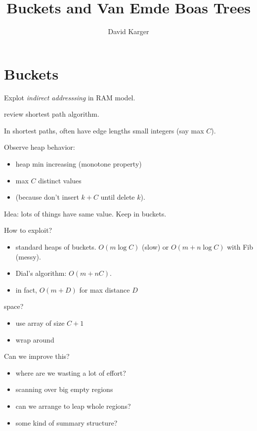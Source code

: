 \documentclass{article}
\title{Buckets and Van Emde Boas Trees}
\author{David Karger}
\begin{document}
\section{Buckets}

Explot \emph{indirect addresssing} in RAM model.

review shortest path algorithm.

In shortest paths, often have edge lengths small integers (say max
$C$).

Observe heap behavior:
\begin{itemize}
\item heap min increasing (monotone property)
\item max $C$ distinct values 
\item (because don't insert $k+C$ until delete $k$).
\end{itemize}

Idea: lots of things have same value.  Keep in buckets.

How to exploit?  
\begin{itemize}
\item standard heaps of buckets.  $O(m\log C)$
  (slow) or $O(m+n\log C)$ with Fib (messy).
\item Dial's algorithm: $O(m+nC)$.
\item in fact, $O(m+D)$ for max distance $D$
\end{itemize}

space?
\begin{itemize}
\item use array of size $C+1$
\item wrap around
\end{itemize}

Can we improve this?
\begin{itemize}
\item where are we wasting a lot of effort?
\item scanning over big empty regions
\item can we arrange to leap whole regions?
\item some kind of summary structure?
\end{itemize}
\end{document}
